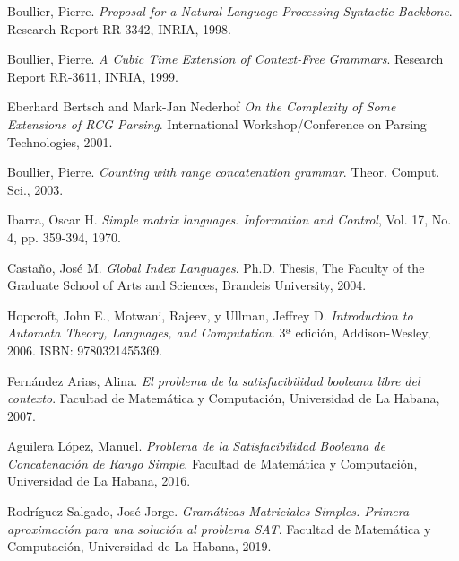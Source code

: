 \documentclass[12pt]{article}
\begin{document}
\begin{thebibliography}{99}

    Boullier, Pierre.
    \textit{Proposal for a Natural Language Processing Syntactic Backbone}.
    Research Report RR-3342, INRIA, 1998.

    Boullier, Pierre.
    \textit{A Cubic Time Extension of Context-Free Grammars}.
    Research Report RR-3611, INRIA, 1999.

    Eberhard Bertsch and Mark-Jan Nederhof
    \textit{On the Complexity of Some Extensions of RCG Parsing}.
    International Workshop/Conference on Parsing Technologies, 2001.

    Boullier, Pierre.
    \textit{Counting with range concatenation grammar}.
    Theor. Comput. Sci., 2003.

    Ibarra, Oscar H.
    \textit{Simple matrix languages}.
    \textit{Information and Control}, Vol. 17, No. 4, pp. 359-394, 1970.

    Castaño, José M.
    \textit{Global Index Languages}.
    Ph.D. Thesis, The Faculty of the Graduate School of Arts and Sciences, Brandeis University, 2004.

    Hopcroft, John E., Motwani, Rajeev, y Ullman, Jeffrey D.
    \textit{Introduction to Automata Theory, Languages, and Computation}.
    3ª edición, Addison-Wesley, 2006. ISBN: 9780321455369.

    Fernández Arias, Alina.
    \textit{El problema de la satisfacibilidad booleana libre del contexto}.
    Facultad de Matemática y Computación, Universidad de La Habana, 2007.

    Aguilera López, Manuel.
    \textit{Problema de la Satisfacibilidad Booleana de Concatenación de Rango Simple}.
    Facultad de Matemática y Computación, Universidad de La Habana, 2016.

    Rodríguez Salgado, José Jorge.
    \textit{Gramáticas Matriciales Simples. Primera aproximación para una solución al problema SAT}.
    Facultad de Matemática y Computación, Universidad de La Habana, 2019.

\end{thebibliography}
\end{document}
